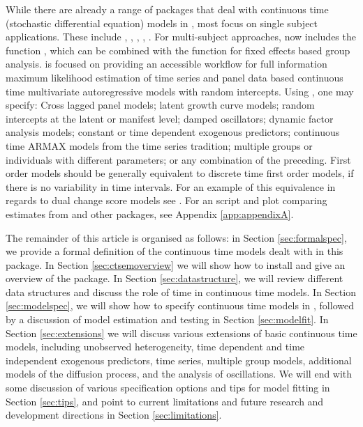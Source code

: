 \documentclass[nojss]{jss}\usepackage[]{graphicx}\usepackage[]{color}
\begin{document}
While there are already a range of packages that deal with continuous time (stochastic differential equation) models in , most focus on single subject applications. These include  \citep{iacus2015pkgsde},  \citep{brouste2014pkgyuima},  \citep{boukhetala2014pkgsim},  \citep{wang2013pkgcts},  \citep{king2010pkgpomp}. For multi-subject approaches,  \citep{neale2015openmx} now includes the function , which can be combined with the function  for fixed effects based group analysis.   is focused on providing an accessible workflow for full information maximum likelihood estimation of time series and panel data based continuous time multivariate autoregressive models with random intercepts. Using , one may specify: Cross lagged panel models; latent growth curve models; random intercepts at the latent or manifest level; damped oscillators; dynamic factor analysis models; constant or time dependent exogenous predictors; continuous time ARMAX models from the time series tradition; multiple groups or individuals with different parameters; or any combination of the preceding. First order models should be generally equivalent to discrete time first order models, if there is no variability in time intervals. For an example of this equivalence in regards to dual change score models see \citet{voelkle2015relating}. For an  script and plot comparing estimates from  and other packages, see Appendix \ref{app:appendixA}.


The remainder of this article is organised as follows: in Section \ref{sec:formalspec}, we provide a formal definition of the continuous time models dealt with in this package. In Section \ref{sec:ctsemoverview} we will show how to install  and give an overview of the package. In Section \ref{sec:datastructure}, we will review different data structures and discuss the role of time in continuous time models. In Section \ref{sec:modelspec}, we will show how to specify continuous time models in , followed by a discussion of model estimation and testing in Section \ref{sec:modelfit}. In Section \ref{sec:extensions} we will discuss various extensions of basic continuous time models, including unobserved heterogeneity, time dependent and time independent exogenous predictors, time series, multiple group models, additional models of the diffusion process, and the analysis of oscillations. We will end with some discussion of various specification options and tips for model fitting in Section \ref{sec:tips}, and point to current limitations and future research and development directions in Section \ref{sec:limitations}.
\end{document}
